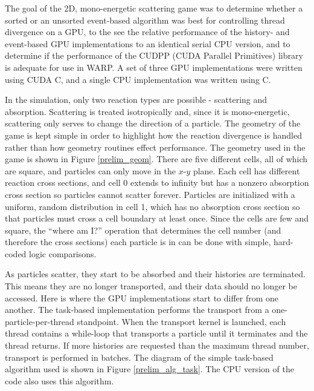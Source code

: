 The goal of the 2D, mono-energetic scattering game was to determine whether a sorted or an unsorted event-based algorithm was best for controlling thread divergence on a GPU, to the see the relative performance of the history- and event-based GPU implementations to an identical serial CPU version, and to determine if the performance of the CUDPP (CUDA Parallel Primitives) library is adequate for use in WARP.   A set of three GPU implementations were written using CUDA C, and a single CPU implementation was written using C.  

In the simulation, only two reaction types are possible - scattering and absorption.  Scattering is treated isotropically and, since it is mono-energetic, scattering only serves to change the direction of a particle.  The geometry of the game is kept simple in order to highlight how the reaction divergence is handled rather than how geometry routines effect performance.   The geometry used in the game is shown in Figure \ref{prelim_geom}.  There are five different cells, all of which are square, and particles can only move in the $x$-$y$ plane.  Each cell has different reaction cross sections, and cell 0 extends to infinity but has a nonzero absorption cross section so particles cannot scatter forever.  Particles are initialized with a uniform, random distribution in cell 1, which has no absorption cross section so that particles must cross a cell boundary at least once.  Since the cells are few and square, the ``where am I?'' operation that determines the cell number (and therefore the cross sections) each particle is in can be done with simple, hard-coded logic comparisons.

As particles scatter, they start to be absorbed and their histories are terminated.  This means they are no longer transported, and their data should no longer be accessed.  Here is where the GPU implementations start to differ from one another.  The task-based implementation performs the transport from a one-particle-per-thread standpoint.  When the transport kernel is launched, each thread contains a while-loop that transports a particle until it terminates and the thread returns.  If more histories are requested than the maximum thread number, transport is performed in batches.  The diagram of the simple task-based algorithm used is shown in Figure \ref{prelim_alg_task}.  The CPU version of the code also uses this algorithm.


